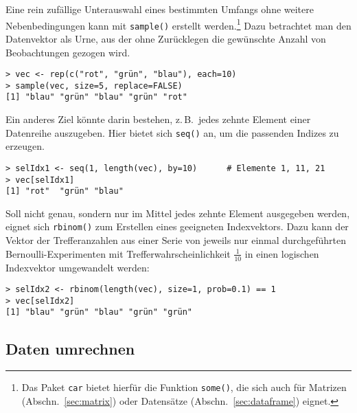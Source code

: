 Eine rein zufällige Unterauswahl eines bestimmten Umfangs ohne weitere Nebenbedingungen kann mit \lstinline!sample()! erstellt werden.\footnote{Das Paket \lstinline!car! \cite{Fox2009} bietet hierfür die Funktion \lstinline!some()!, die sich auch für Matrizen (Abschn.\ \ref{sec:matrix}) oder Datensätze (Abschn.\ \ref{sec:dataframe}) eignet.} Dazu betrachtet man den Datenvektor als Urne, aus der ohne Zurücklegen die gewünschte Anzahl von Beobachtungen gezogen wird.
\begin{lstlisting}
> vec <- rep(c("rot", "grün", "blau"), each=10)
> sample(vec, size=5, replace=FALSE)
[1] "blau" "grün" "blau" "grün" "rot"
\end{lstlisting}

Ein anderes Ziel könnte darin bestehen, z.\,B.\ jedes zehnte Element einer Datenreihe auszugeben. Hier bietet sich \lstinline!seq()! an, um die passenden Indizes zu erzeugen.
\begin{lstlisting}
> selIdx1 <- seq(1, length(vec), by=10)      # Elemente 1, 11, 21
> vec[selIdx1]
[1] "rot"  "grün" "blau"
\end{lstlisting}

Soll nicht genau, sondern nur im Mittel jedes zehnte Element ausgegeben werden, eignet sich \lstinline!rbinom()! zum Erstellen eines geeigneten Indexvektors. Dazu kann der Vektor der Trefferanzahlen aus einer Serie von jeweils nur einmal durchgeführten Bernoulli-Experimenten mit Trefferwahrscheinlichkeit $\frac{1}{10}$ in einen logischen Indexvektor umgewandelt werden:
\begin{lstlisting}
> selIdx2 <- rbinom(length(vec), size=1, prob=0.1) == 1
> vec[selIdx2]
[1] "blau" "grün" "blau" "grün" "grün"
\end{lstlisting}

\subsection{Daten umrechnen}

